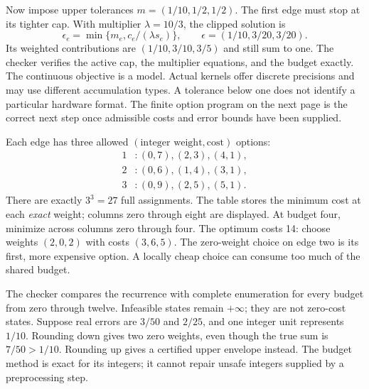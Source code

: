 Now impose upper tolerances $m=(1/10,1/2,1/2)$. The first edge must stop at its tighter cap. With multiplier $\lambda=10/3$, the clipped solution is
\[
\epsilon_e=\min\{m_e,c_e/(\lambda s_e)\},\qquad
\epsilon=(1/10,3/20,3/20).
\]
Its weighted contributions are $(1/10,3/10,3/5)$ and still sum to one. The checker verifies the active cap, the multiplier equations, and the budget exactly.
The continuous objective is a model. Actual kernels offer discrete precisions and may use different accumulation types. A tolerance below one does not identify a particular hardware format. The finite option program on the next page is the correct next step once admissible costs and error bounds have been supplied.

Each edge has three allowed $(\text{integer weight},\text{cost})$ options:
\[
\begin{aligned}
1 &: (0,7),(2,3),(4,1),\\
2 &: (0,6),(1,4),(3,1),\\
3 &: (0,9),(2,5),(5,1).
\end{aligned}
\]
There are exactly $3^3=27$ full assignments. The table stores the minimum cost at each \emph{exact} weight; columns zero through eight are displayed.
At budget four, minimize across columns zero through four. The optimum costs 14: choose weights $(2,0,2)$ with costs $(3,6,5)$. The zero-weight choice on edge two is its first, more expensive option. A locally cheap choice can consume too much of the shared budget.

The checker compares the recurrence with complete enumeration for every budget from zero through twelve. Infeasible states remain $+\infty$; they are not zero-cost states.
Suppose real errors are $3/50$ and $2/25$, and one integer unit represents $1/10$. Rounding down gives two zero weights, even though the true sum is $7/50>1/10$. Rounding up gives a certified upper envelope instead. The budget method is exact for its integers; it cannot repair unsafe integers supplied by a preprocessing step.

